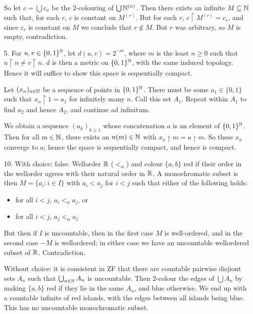 \documentclass[10pt]{article}
\begin{document}
So let $c = \bigcup c_n$ be the $2$-colouring of $\bigcup \mathbb{N}^{(n)}$. Then there exists an infinite $M\subseteq \mathbb{N}$ such that, for each $r$, $c$ is constant on $M^{(r)}$. But for each $r$, $c\restriction M^{(r)} = c_r$, and since $c_r$ is constant on $M$ we conclude that $r \not \in M$. But $r$ was arbitrary, so $M$ is empty, contradiction.

5. For $u,v \in \{0,1\}^{\mathbb{N}}$, let $d(u,v) = 2^{-m}$, where $m$ is the least $n\ge 0$ such that $u\restriction n \ne v \restriction n$. $d$ is then a metric on $\{0,1\}^{\mathbb{N}}$, with the same induced topology. Hence it will suffice to show this space is sequentially compact.

Let $(x_n)_{n\in\mathbb{N}}$ be a sequence of points in $\{0,1\}^{\mathbb{N}}$. There must be some $a_1 \in \{0,1\}$ such that $x_n\restriction 1 = a_1$ for infinitely many $n$. Call this set $A_1$. Repeat within $A_1$ to find $a_2$ and hence $A_2$, and continue ad infinitum.

We obtain a sequence $(a_k)_{k\ge 1}$ whose concatenation $a$ is an element of $\{0,1\}^{\mathbb{N}}$. Then for all $m\in \mathbb{N}$, there exists an $n(m)\in\mathbb{N}$ with $x_n\restriction m = a\restriction m$. So these $x_n$ converge to $a$; hence the space is sequentially compact, and hence is compact.

10. With choice: false. Wellorder $\mathbb{R}$ ($<_\alpha$) and colour $\{a,b\}$ red if their order in the wellorder agrees with their natural order in $\mathbb{R}$. A monochromatic subset is then $M = \{a_i : i \in I\}$ with $a_i < a_j$ for $i < j$ such that either of the following holds:
\begin{itemize}
    \item for all $i < j$, $a_i <_\alpha a_j$, or
    \item for all $i < j$, $a_j <_\alpha a_j$
\end{itemize}
But then if $I$ is uncountable, then in the first case $M$ is well-ordered, and in the second case $-M$ is wellordered; in either case we have an uncountable wellordered subset of $\mathbb{R}$. Contradiction.

Without choice: it is consistent in ZF that there are countable pairwise disjiont sets $A_n$ such that $\bigcup_{n\in\mathbb{N}}A_n$ is uncountable. Then $2$-colour the edges of $\bigcup A_n$ by making $\{a,b\}$ red if they lie in the same $A_n$, and blue otherwise. We end up with a countable infinite of red islands, with the edges between all islands being blue. This has no uncountable monochromatic subset.
\end{document}
